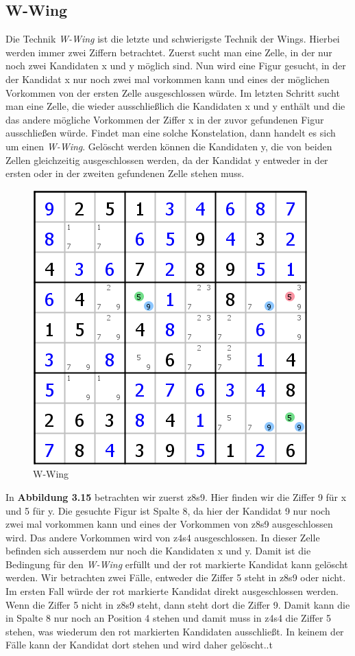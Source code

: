 \newpage
\subsection{W-Wing}
Die Technik \textit{W-Wing} ist die letzte und schwierigste Technik der Wings. Hierbei werden immer zwei Ziffern betrachtet. Zuerst sucht man eine Zelle, in der nur noch zwei Kandidaten x und y möglich sind. Nun wird eine Figur gesucht, in der der Kandidat x nur noch zwei mal vorkommen kann und eines der möglichen Vorkommen von der ersten Zelle ausgeschlossen würde. Im letzten Schritt sucht man eine Zelle, die wieder ausschließlich die Kandidaten x und y enthält und die das andere mögliche Vorkommen der Ziffer x in der zuvor gefundenen Figur ausschließen würde. Findet man eine solche Konstelation, dann handelt es sich um einen \textit{W-Wing}. Gelöscht werden können die  Kandidaten y, die von beiden Zellen gleichzeitig ausgeschlossen werden, da der Kandidat y entweder in der ersten oder in der zweiten gefundenen Zelle stehen muss.

\begin{figure}[h]
\begin{center}
\includegraphics{./img/W_Wing.png}
\caption{W-Wing}
\end{center}
\end{figure}

In \textbf{Abbildung 3.15} betrachten wir zuerst z8s9. Hier finden wir die Ziffer 9 für x und 5 für y. Die gesuchte Figur ist Spalte 8, da hier der Kandidat 9 nur noch zwei mal vorkommen kann und eines der Vorkommen von z8s9 ausgeschlossen wird.
Das andere Vorkommen wird von z4s4 ausgeschlossen. In dieser Zelle befinden sich ausserdem nur noch die Kandidaten x und y. Damit ist die Bedingung für den \textit{W-Wing} erfüllt und der rot markierte Kandidat kann gelöscht werden. Wir betrachten zwei Fälle, entweder die Ziffer 5 steht in z8s9 oder nicht. Im ersten Fall würde der rot markierte Kandidat direkt ausgeschlossen werden. Wenn die Ziffer 5 nicht in z8s9 steht, dann steht dort die Ziffer 9. Damit kann die in Spalte 8 nur noch an Position 4 stehen und damit muss in z4s4 die Ziffer 5 stehen, was wiederum den rot markierten Kandidaten ausschließt. In keinem der Fälle kann der Kandidat dort stehen und wird daher gelöscht..t